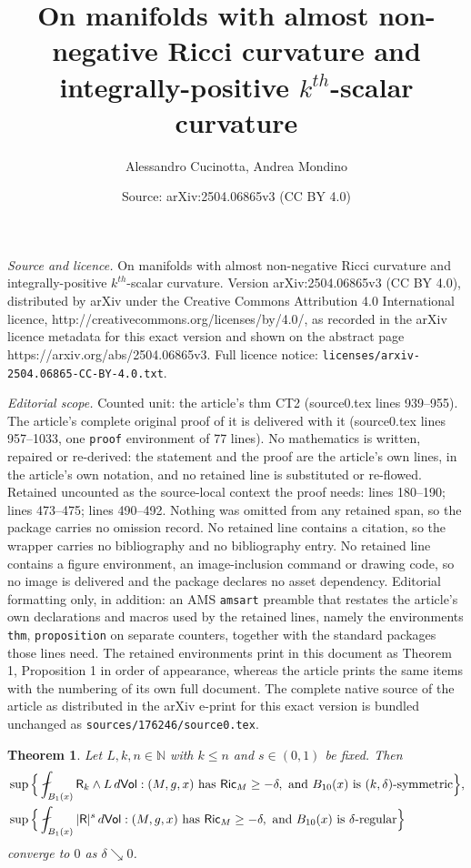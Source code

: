 \documentclass[10pt,a4paper]{amsart}
\title{On manifolds with almost non-negative Ricci curvature and integrally-positive $k^{th}$-scalar curvature}
\author{Alessandro Cucinotta, Andrea Mondino}
\date{Source: arXiv:2504.06865v3 (CC BY 4.0)}
\newtheorem{thm}{Theorem}
\newcommand{\R}{\mathsf{R}}
\newcommand{\Ric}{\mathsf{Ric}}
\newcommand{\bb}[1]{\mathbb{#1}}
\newcommand{\de}{{\rm d}}
\newcommand{\ssf}[1]{\mathsf{#1}}
\begin{document}
\maketitle

\noindent\emph{Source and licence.} On manifolds with almost non-negative Ricci curvature and integrally-positive $k^{th}$-scalar curvature. Version arXiv:2504.06865v3 (CC BY 4.0), distributed by arXiv under the Creative Commons Attribution 4.0 International licence, http://creativecommons.org/licenses/by/4.0/, as recorded in the arXiv licence metadata for this exact version and shown on the abstract page https://arxiv.org/abs/2504.06865v3. Full licence notice: \texttt{licenses/arxiv-2504.06865-CC-BY-4.0.txt}.\par\smallskip

\noindent\textit{Editorial scope.} Counted unit: the article's thm CT2 (source0.tex lines 939--955). The article's complete original proof of it is delivered with it (source0.tex lines 957--1033, one \texttt{proof} environment of 77 lines). No mathematics is written, repaired or re-derived: the statement and the proof are the article's own lines, in the article's own notation, and no retained line is substituted or re-flowed.  Retained uncounted as the source-local context the proof needs: lines 180--190; lines 473--475; lines 490--492.  Nothing was omitted from any retained span, so the package carries no omission record.  No retained line contains a citation, so the wrapper carries no bibliography and no bibliography entry.  No retained line contains a figure environment, an image-inclusion command or drawing code, so no image is delivered and the package declares no asset dependency.  Editorial formatting only, in addition: an AMS \texttt{amsart} preamble that restates the article's own declarations and macros used by the retained lines, namely the environments \texttt{thm}, \texttt{proposition} on separate counters, together with the standard packages those lines need.  The retained environments print in this document as Theorem 1, Proposition 1 in order of appearance, whereas the article prints the same items with the numbering of its own full document.  The complete native source of the article as distributed in the arXiv e-print for this exact version is bundled unchanged as \texttt{sources/176246/source0.tex}.
\begin{thm} \label{CT1}
    Let $L,k,n \in \bb{N}$ with $k \leq n$ and $s \in (0,1)$ be fixed. Then 
    \begin{align*}
    &\sup \Big\{\fint_{B_1(x)} \R_{k} \wedge L \, \de \ssf{Vol} : (M,g,x) \text{ has } \Ric_{M} \geq -\delta, \text{ and } B_{10}(x) \text{ is  $(k,\delta)$-symmetric} 
    \Big\} ,
    \\
    &  \sup \Big\{\fint_{B_1(x)} |\R|^s \, \de \ssf{Vol} : (M,g,x) \text{ has } \Ric_{M} \geq -\delta, \text{ and } B_{10}(x) \text{ is } \delta \text{-regular} 
    \Big\}  
    \end{align*}
    converge to $0$ as $\delta \searrow 0$.
    \end{thm}
\end{document}

